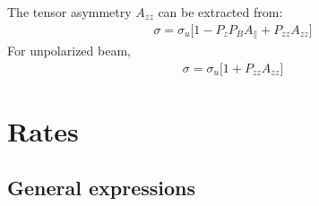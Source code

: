 \documentclass[11pt]{article}
\begin{document}

%
\pagestyle{plain}

The tensor asymmetry $A_{zz}$ can be extracted from:
\begin{eqnarray}
\sigma = \sigma_u \bigg[1 - P_z P_B A_{\parallel} + P_{zz} A_{zz}\bigg]
\label{xs} 
\end{eqnarray}
For unpolarized beam, 
\begin{eqnarray}
\sigma = \sigma_u \bigg[1 + P_{zz} A_{zz}\bigg]
\label{xsbis} 
\end{eqnarray}

\section{Rates}

\subsection{General expressions}
\end{document}
